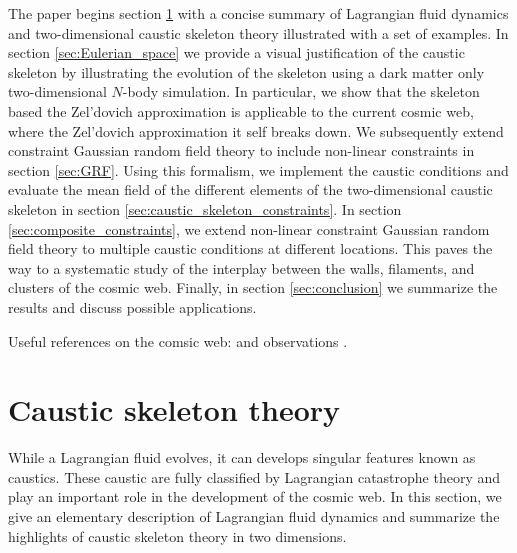 \documentclass[a4paper, 11pt]{article}
\begin{document}
The paper begins section \ref{sec:Caustic_Skeleton_Theory} with a concise summary of Lagrangian fluid dynamics and two-dimensional caustic skeleton theory illustrated with a set of examples. In section \ref{sec:Eulerian_space} we provide a visual justification of the caustic skeleton by illustrating the evolution of the skeleton using a dark matter only two-dimensional $N$-body simulation. In particular, we show that the skeleton based the Zel'dovich approximation is applicable to the current cosmic web, where the Zel'dovich approximation it self breaks down. We subsequently extend constraint Gaussian random field theory to include non-linear constraints in section \ref{sec:GRF}. Using this formalism, we implement the caustic conditions and evaluate the mean field of the different elements of the two-dimensional caustic skeleton in section \ref{sec:caustic_skeleton_constraints}. In section \ref{sec:composite_constraints}, we extend non-linear constraint Gaussian random field theory to multiple caustic conditions at different locations. This paves the way to a systematic study of the interplay between the walls, filaments, and clusters of the cosmic web. Finally, in section \ref{sec:conclusion} we summarize the results and discuss possible applications.


\begin{framed}
Useful references on the comsic web: 
\cite{Peebles:1980, Bond:1996, Weygaert:2008, Aragon:2010a, Aragon:2010b, Jasche:2010, Kitaura:2013, Cautun:2014, Leclercq:2015, Leclercq:2017, Libeskind:2017} and observations
\cite{Colless:2003, Tegmark:2004, Huchra:2012, Guzzo:2014}.
\end{framed}











\section{Caustic skeleton theory}\label{sec:Caustic_Skeleton_Theory}
While a Lagrangian fluid evolves, it can develops singular features known as caustics. These caustic are fully classified by Lagrangian catastrophe theory and play an important role in the development of the cosmic web. In this section, we give an elementary description of Lagrangian fluid dynamics and summarize the highlights of caustic skeleton theory in two dimensions.
\end{document}
